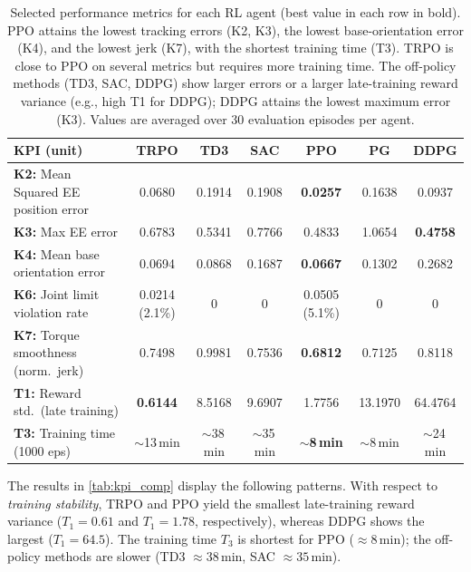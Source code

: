 \documentclass{ieeeaccess}
\begin{document}
\begin{table}[!t]
\centering
\caption{Selected performance metrics for each RL agent (best value in each row in bold). PPO attains the
lowest tracking errors (K2, K3), the lowest base-orientation error (K4), and the lowest jerk (K7), with the
shortest training time (T3). TRPO is close to PPO on several metrics but requires more training time. The
off-policy methods (TD3, SAC, DDPG) show larger errors or a larger late-training reward variance (e.g., high
T1 for DDPG); DDPG attains the lowest maximum error (K3). Values are averaged over 30 evaluation episodes per agent.}
\label{tab:kpi_comp}
\renewcommand{\arraystretch}{1.3}
\setlength{\tabcolsep}{8pt}
\begin{tabular}{lcccccc}
\toprule
\textbf{KPI (unit)} & \textbf{TRPO} & \textbf{TD3} & \textbf{SAC} & \textbf{PPO} & \textbf{PG} & \textbf{DDPG} \\
\midrule
\textbf{K2:} Mean Squared EE position error &
0.0680 & 0.1914 & 0.1908 & \textbf{0.0257} & 0.1638 & 0.0937 \\
\textbf{K3:} Max EE error &
0.6783 & 0.5341 & 0.7766 & 0.4833 & 1.0654 & \textbf{0.4758} \\
\textbf{K4:} Mean base orientation error &
0.0694 & 0.0868 & 0.1687 & \textbf{0.0667} & 0.1302 & 0.2682 \\
\textbf{K6:} Joint limit violation rate &
0.0214 (2.1\%) & 0 & 0 & 0.0505 (5.1\%) & 0 & 0 \\
\textbf{K7:} Torque smoothness (norm.\ jerk) &
0.7498 & 0.9981 & 0.7536 & \textbf{0.6812} & 0.7125 & 0.8118 \\
\textbf{T1:} Reward std.\ (late training) &
\textbf{0.6144} & 8.5168 & 9.6907 & 1.7756 & 13.1970 & 64.4764 \\
\textbf{T3:} Training time (1000 eps) &
$\sim$13\,min & $\sim$38\,min & $\sim$35\,min & \textbf{$\sim$8\,min} & $\sim$8\,min & $\sim$24\,min \\
\bottomrule
\end{tabular}
\end{table}

The results in \autoref{tab:kpi_comp} display the following patterns. With respect to \emph{training stability}, TRPO and PPO yield the smallest late-training reward variance ($T_1 = 0.61$ and $T_1 = 1.78$, respectively), whereas DDPG shows the largest ($T_1 = 64.5$). The training time $T_3$ is shortest for PPO ($\approx 8\,\mathrm{min}$); the off-policy methods are slower (TD3 $\approx 38\,\mathrm{min}$, SAC $\approx 35\,\mathrm{min}$).
\end{document}
